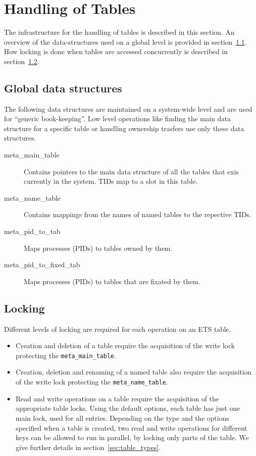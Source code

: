 \documentclass[aps,pre,preprint,nofootinbib]{revtex4}
\begin{document}
\section{Handling of Tables}

The infrastructure for the handling of tables is described in this section. 
An overview of the data-structures used on a global level is provided in section~\ref{sec:tables_overview}.
How locking is done when tables are accessed concurrently is described in section~\ref{sec:tables_locking}.

\subsection{Global data structures}
\label{sec:tables_overview}

The following data structures are maintained on a system-wide level and are used for ``generic book-keeping''.
Low level operations like finding the main data structure for a specific table or handling ownership trasfers use only these data structures.

\begin{description}
\item[meta\_main\_table]
  Contains pointers to the main data structure of all the tables that exis currently in the system.
  TIDs map to a slot in this table.
\item[meta\_name\_table]
  Contains mappings from the names of named tables to the repective TIDs.
\item[meta\_pid\_to\_tab]
  Maps processes (PIDs) to tables owned by them.
\item[meta\_pid\_to\_fixed\_tab]
  Maps processes (PIDs) to tables that are fixated by them.
\end{description}

\subsection{Locking} \label{sec:tables_locking}

Different levels of locking are required for each operation on an ETS table.

\begin{itemize}
\item Creation and deletion of a table require the acquisition of the write lock protecting the \verb|meta_main_table|.
\item Creation, deletion and renaming of a named table also require the acquisition of the write lock protecting the \verb|meta_name_table|.
\item Read and write operations on a table require the acquisition of the appropriate table locks.
  Using the default options, each table has just one main lock, used for all entries.
  Depending on the type and the options specified when a table is created, two read and write operations for different keys can be allowed to run in parallel, by locking only parts of the table.
  We give further details in section~\ref{sec:table_types}.
\end{itemize}
\end{document}
